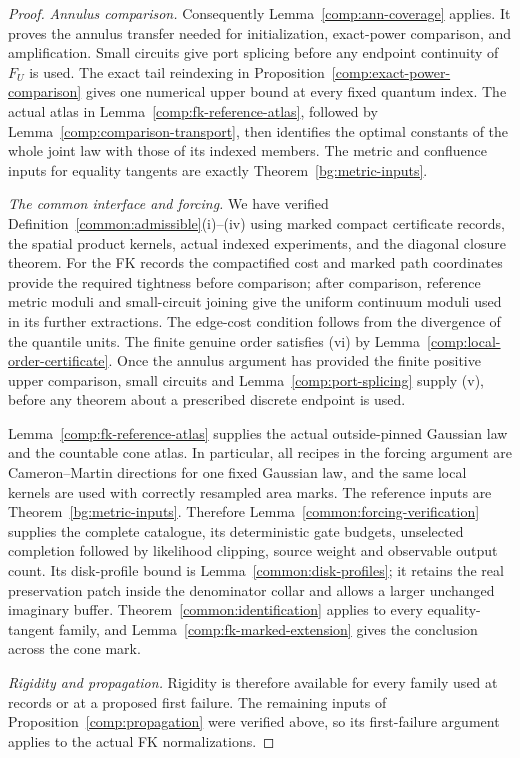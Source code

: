 \begin{proof}
\smallskip\noindent\emph{Annulus comparison.}
Consequently Lemma~\ref{comp:ann-coverage} applies.  It proves the
annulus transfer needed for initialization, exact-power comparison,
and amplification.  Small circuits give port splicing before any
endpoint continuity of $F_U$ is used.  The exact tail reindexing in
Proposition~\ref{comp:exact-power-comparison} gives one numerical
upper bound at every fixed quantum index.  The actual atlas in
Lemma~\ref{comp:fk-reference-atlas}, followed by
Lemma~\ref{comp:comparison-transport}, then identifies the optimal
constants of the whole joint law with those of its indexed members.  The metric and confluence
inputs for equality tangents are exactly
Theorem~\ref{bg:metric-inputs}.

\smallskip\noindent\emph{The common interface and forcing.}
We have verified Definition~\ref{common:admissible}(i)--(iv) using
marked compact certificate records, the spatial product kernels,
actual indexed experiments, and the diagonal closure theorem.
For the FK records the compactified cost and marked path coordinates
provide the required tightness before comparison; after comparison,
reference metric moduli and small-circuit joining give the uniform
continuum moduli used in its further extractions.  The edge-cost
condition follows from the divergence of the quantile units.  The
finite genuine order satisfies (vi) by
Lemma~\ref{comp:local-order-certificate}.  Once the annulus argument
has provided the finite positive upper comparison, small circuits
and Lemma~\ref{comp:port-splicing} supply (v), before any theorem
about a prescribed discrete endpoint is used.

Lemma~\ref{comp:fk-reference-atlas} supplies the actual outside-pinned
Gaussian law and the countable cone atlas.  In particular, all recipes
in the forcing argument are Cameron--Martin directions for one fixed
Gaussian law, and the same local kernels are used with correctly
resampled area marks.  The reference inputs are
Theorem~\ref{bg:metric-inputs}.  Therefore
Lemma~\ref{common:forcing-verification} supplies the complete catalogue,
its deterministic gate budgets, unselected completion followed by
likelihood clipping, source weight and observable output count.  Its disk-profile bound is
Lemma~\ref{common:disk-profiles}; it retains the real preservation
patch inside the denominator collar and allows a larger unchanged
imaginary buffer.  Theorem~\ref{common:identification} applies to
every equality-tangent family, and
Lemma~\ref{comp:fk-marked-extension} gives the conclusion across the
cone mark.

\smallskip\noindent\emph{Rigidity and propagation.}
Rigidity is therefore available for every family used at records
or at a proposed first failure.  The remaining inputs of
Proposition~\ref{comp:propagation} were verified above, so its
first-failure argument applies to the actual FK normalizations.
\end{proof}

